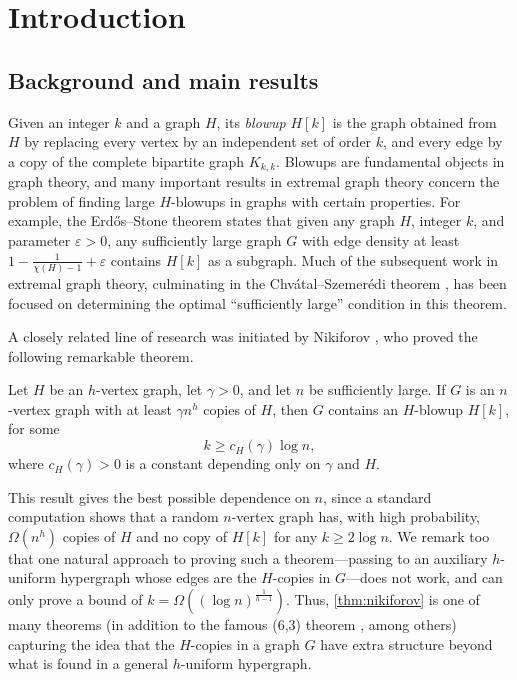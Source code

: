 \section{Introduction}
\subsection{Background and main results}
Given an integer $k$ and a graph $H$, its \emph{blowup} $H[k]$ is the graph obtained from $H$ by replacing every vertex by an independent set of order $k$, and every edge by a copy of the complete bipartite graph $K_{k,k}$. Blowups are fundamental objects in graph theory, and many important results in extremal graph theory concern the problem of finding large $H$-blowups in graphs with certain properties. For example, the Erd\H os--Stone theorem \cite{MR0018807} states that given any graph $H$, integer $k$, and parameter $\varepsilon>0$, any sufficiently large graph $G$ with edge density at least $1-\frac{1}{\chi(H)-1}+\varepsilon$ contains $H[k]$ as a subgraph. Much of the subsequent work in extremal graph theory, culminating in the Chv\'atal--Szemer\'edi theorem \cite{MR0609100}, has been focused on determining the optimal ``sufficiently large'' condition in this theorem.

A closely related line of research was initiated by Nikiforov \cite{MR2409174,MR2398823}, who proved the following remarkable theorem. 
\begin{theorem}\label{thm:nikiforov}
    Let $H$ be an $h$-vertex graph, let $\gamma>0$, and let $n$ be sufficiently large. If $G$ is an $n$-vertex graph with at least $\gamma n^h$ copies of $H$, then $G$ contains an $H$-blowup $H[k]$, for some
    \[
        k \geq c_H(\gamma) \log n,
    \]
    where $c_H(\gamma)>0$ is a constant depending only on $\gamma$ and $H$.
\end{theorem}
This result gives the best possible dependence on $n$, since a standard computation shows that a random $n$-vertex graph has, with high probability, $\Omega(n^h)$ copies of $H$ and no copy of $H[k]$ for any $k \geq 2\log n$. We remark too that one natural approach to proving such a theorem---passing to an auxiliary $h$-uniform hypergraph whose edges are the $H$-copies in $G$---does not work, and can only prove a bound of $k = \Omega((\log n)^{\frac{1}{h-1}})$. Thus, \cref{thm:nikiforov} is one of many theorems (in addition to the famous (6,3) theorem \cite{MR0519318}, among others) capturing the idea that the $H$-copies in a graph $G$ have extra structure beyond what is found in a general $h$-uniform hypergraph.

